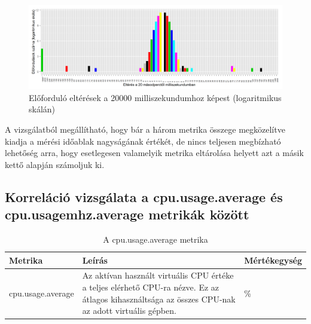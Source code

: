 \documentclass[a4paper,10pt,titlepage]{article}
\newcommand{\todo}[1]{
    \vfill
    \begingroup
        \setlength{\parindent}{0cm}
        \fcolorbox{todofrszin}{todobgszin}{
            \parbox{\textwidth}{
                \vskip10pt
                \leftskip10pt
                \rightskip10pt
            
                \emph{TODO: #1}
  
                \vskip10pt
            }
        }
    \endgroup
    \vfill
}
\begin{document}
\begin{figure}[h!]
\centering
\includegraphics[width=1.00\textwidth]{figures/cpu_run_wait_ready-diff-dist-log-20120826230140-20120924083120.png}
\caption{ Előforduló eltérések a 20000 milliszekundumhoz képest (logaritmikus skálán)\label{fig:cpu_run_wait_ready-diff-dist-log}}
\end{figure}

A vizsgálatból megállítható, hogy bár a három metrika összege megközelítve kiadja a mérési időablak nagyságának értékét, de nincs teljesen megbízható lehetőség arra, hogy esetlegesen valamelyik metrika eltárolása helyett azt a másik kettő alapján számoljuk ki.

%
%


\subsection{Korreláció vizsgálata a cpu.usage.average és cpu.usagemhz.average metrikák között}

\begin{table}[h]
	\caption{A cpu.usage.average metrika}
	\centering
	\small
	\begin{tabular}{| p{3.5cm} | p{7.5cm} | p{2cm} |}
		\hline
		\rowcolor{tc_bone} \textbf{Metrika} & \textbf{Leírás} & \textbf{Mértékegység} \\
		\hline
		cpu.usage.average & Az aktívan használt virtuális CPU értéke a teljes elérhető CPU-ra nézve. Ez az átlagos kihasználtsága az összes CPU-nak az adott virtuális gépben. & \% \\ 
		\hline
	\end{tabular}
	\normalsize
	\label{tab:cpu.usage.average}
\end{table}
\end{document}
